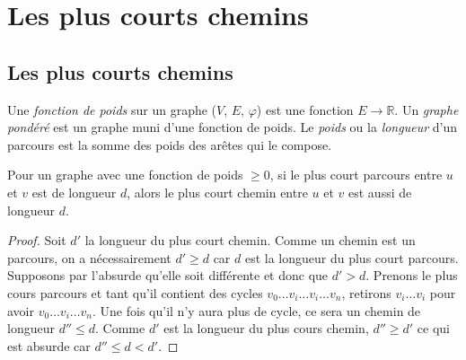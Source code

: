 \section{Les plus courts chemins}
\subsection{Les plus courts chemins}
\begin{mydef}
  Une \emph{fonction de poids} sur un graphe ($V$, $E$, $\varphi$) est une fonction $E \to \mathbb{R}$. Un \emph{graphe pondéré} est un graphe muni d’une fonction de poids. Le \emph{poids} ou la \emph{longueur} d’un parcours est la somme des poids des arêtes qui le compose.
\end{mydef}

\begin{mytheo} 
  Pour un graphe avec une fonction de poids $\geq 0$, si le plus court parcours entre $u$ et $v$ est de longueur $d$, alors le plus court chemin entre $u$ et $v$ est aussi de longueur $d$.
  \begin{proof}
    Soit $d'$ la longueur du plus court chemin.
    Comme un chemin est un parcours, on a nécessairement $d' \geq d$ car $d$ est la longueur du plus court parcours.
    Supposons par l'absurde qu'elle soit différente et donc que $d' > d$.
    Prenons le plus cours parcours et tant qu'il contient des cycles $v_0 \ldots v_i \ldots v_i \ldots v_n$,
    retirons $v_i \ldots v_i$ pour avoir $v_0 \ldots v_i \ldots v_n$.
    Une fois qu'il n'y aura plus de cycle, ce sera un chemin de longueur $d'' \leq d$.
    Comme $d'$ est la longueur du plus cours chemin, $d'' \geq d'$ ce qui est absurde car $d'' \leq d < d'$.
  \end{proof}
\end{mytheo}


